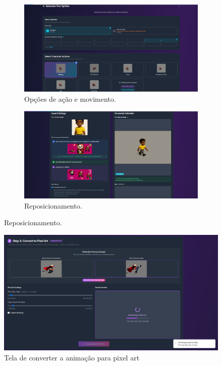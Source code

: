 \begin{figure}[htbp]
    \centering
    \caption{\small Tela para geração de animação}
    \label{fig:godmodAIGerarAnimacao}
    \begin{subfigure}{1\linewidth}
        \includegraphics[width=1\linewidth]{figs/godmodAI/tela criando animação.PNG}
        \caption{\small Opções de ação e movimento.}
        \label{fig:godmodAIGerarAnimacao1}
    \end{subfigure}
    \begin{subfigure}{1\linewidth}
        \includegraphics[width=1\linewidth]{figs/godmodAI/tela criando animação 2.PNG}
        \caption{\small Reposicionamento.}
        \label{fig:godmodAIGerarAnimacao2}
    \end{subfigure}
\end{figure}

\begin{figure}[htbp]
    \centering
    \caption{\small Tela de converter a animação para pixel art}
    \label{fig:godmodAI3Dtopixel}
    \includegraphics[width=1\linewidth]{figs/godmodAI/video para pixel art.PNG}
\end{figure}

